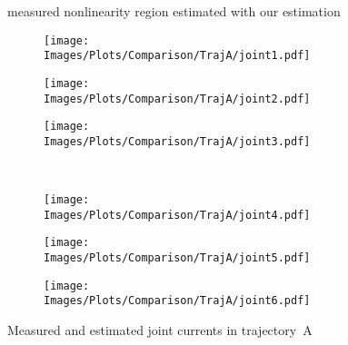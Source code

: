 \begin{figure*}[t]
    \centering
    \newcommand*{\figsize}{0.32\textwidth}

    \begin{center}
    \footnotesize{{\legblue} measured \hspace{0.5em} {\boxgray} nonlinearity region \hspace{0.5em} {\legred} estimated with \cite{gaz_model-based_2018} \hspace{0.5em} {\legyellow} our estimation}
    \end{center}

    \begin{subfigure}[b]{\figsize}
        \centering
        \texttt{[image: Images/Plots/Comparison/TrajA/joint1.pdf]}
    \end{subfigure}
    \hfill
    \begin{subfigure}[b]{\figsize}
        \centering
        \texttt{[image: Images/Plots/Comparison/TrajA/joint2.pdf]}
    \end{subfigure}
    \hfill
    \begin{subfigure}[b]{\figsize}
        \centering
        \texttt{[image: Images/Plots/Comparison/TrajA/joint3.pdf]}
    \end{subfigure}
    \\ \vspace{0.25em}
    \begin{subfigure}[b]{\figsize}
        \centering
        \texttt{[image: Images/Plots/Comparison/TrajA/joint4.pdf]}
    \end{subfigure}
    \hfill
    \begin{subfigure}[b]{\figsize}
        \centering
        \texttt{[image: Images/Plots/Comparison/TrajA/joint5.pdf]}
    \end{subfigure}
    \hfill
    \begin{subfigure}[b]{\figsize}
        \centering
        \texttt{[image: Images/Plots/Comparison/TrajA/joint6.pdf]}
    \end{subfigure}

    \caption{Measured and estimated joint currents in trajectory~A}
    \label{fig:comparison-traj-a}
\end{figure*}
